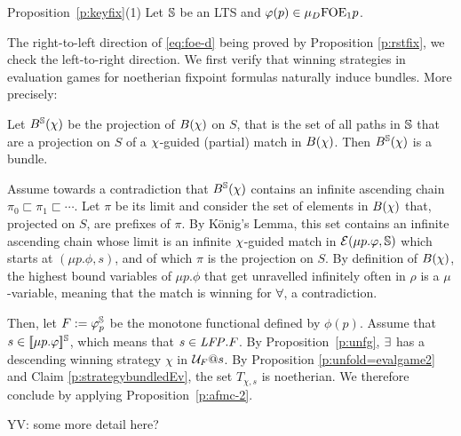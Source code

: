 
\begin{proofof}{Proposition~\ref{p:keyfix}(1)}
%    
Let $\mathbb{S}$ be an LTS and $\varphi(p) \in \mu_{D}\mathrm{FOE}_1{p}$. 

The right-to-left direction of \eqref{eq:foe-d} being proved by 
Proposition \ref{p:rstfix}, we check the left-to-right direction.
We first verify that winning strategies in evaluation games for noetherian fixpoint formulas naturally induce bundles. More precisely:


\begin{claim}\label{p:strategybundledEv}
Let $B^{\mathbb{S}}(\chi)$ be the projection of $B(\chi)$ on $S$, that is the set of all paths in $\mathbb{S}$ that are a projection on $S$ of a $\chi$-guided (partial) match in $B(\chi)$. Then $B^{\mathbb{S}}(\chi)$ is a bundle.
\end{claim}
\begin{pfclaim}
Assume towards a contradiction that $B^{\mathbb{S}}(\chi)$ contains an infinite 
ascending chain $\pi_{0} \sqsubset \pi_{1} \sqsubset \cdots$. 
Let $\pi$ be its limit and consider the set of elements in $B(\chi)$ that,
projected on $S$, are prefixes of $\pi$. 
By  K\"{o}nig's Lemma, this set contains an infinite ascending chain whose 
limit is an infinite $\chi$-guided match in $\mathcal{E}(\mu p. \varphi,\mathbb{S})$
which starts at $(\mu p. \phi,s)$, and of which $\pi$ is the projection on $S$.
By definition of $B(\chi)$,  the highest bound variables of $\mu p. \phi$ 
that get unravelled infinitely often in $\rho$ is a $\mu$-variable, meaning that
the match is winning for $\forall$, a contradiction.
\end{pfclaim}

Then, let $F := \varphi_{p}^{\mathbb{S}}$ be the monotone functional defined by $\phi(p)$.
Assume that $s \in [\![ \mu p.\varphi ]\!]^{\mathbb{S}}$, which means that $s \in \mathit{LFP}. F$. 
By Proposition~\ref{p:unfg}, $\exists$ has a descending winning strategy $\chi$
in $\mathcal{U}_{F}@s$. 
By Proposition \ref{p:unfold=evalgame2} and Claim \ref{p:strategybundledEv}, the
set $T_{\chi, s}$ is noetherian.   
We therefore conclude by applying  Proposition~\ref{p:afmc-2}.
\btbs
\item
YV: some more detail here?
\etbs
\end{proofof}
